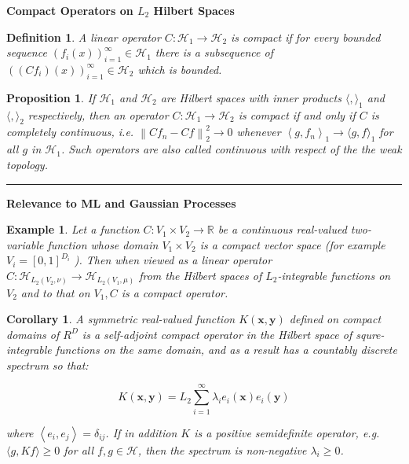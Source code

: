 \documentclass[11pt]{article}
\theoremstyle{plain} %
\newtheorem{corollary}[theorem]{Corollary}
\newtheorem{proposition}[theorem]{Proposition}
\newtheorem{definition}[theorem]{Definition}
\newtheorem{example}[theorem]{Example}
\theoremstyle{remark}
\begin{document}
\textbf{Compact Operators on $L_{2}$ Hilbert Spaces}
\begin{definition}
  A linear operator $C: \mathcal{H}_{1} \rightarrow \mathcal{H}_{2}$ is compact if
for every bounded sequence $\left(f_{i}(x)\right)_{i=1}^{\infty} \in
  \mathcal{H}_{1}$ there is a subsequence of $\left(\left(C
  f_{i}\right)(x)\right)_{i=1}^{\infty} \in \mathcal{H}_{2}$ which is bounded.
\end{definition}

\begin{proposition}
  If $\mathcal{H}_{1}$ and $\mathcal{H}_{2}$ are Hilbert spaces with inner
products $\langle,\rangle_{1}$ and $\langle,\rangle_{2}$ respectively, then an
operator $C: \mathcal{H}_{1} \rightarrow \mathcal{H}_{2}$ is compact if and only
if $C$ is completely continuous, i.e. $\left\|C f_{n}-C f\right\|_{2}^{2}
  \rightarrow 0$ whenever $\left\langle g, f_{n}\right\rangle_{1}
  \rightarrow\langle g, f\rangle_{1}$ for all $g$ in $\mathcal{H}_{1}$. Such
operators are also called continuous with respect of the the weak topology.
\end{proposition}
\vspace*{0.4em}
\hrule

\textbf{Relevance to ML and Gaussian Processes}

\begin{example}
Let a function $C: V_{1} \times V_{2} \rightarrow \mathbb{R}$ be a continuous
real-valued two-variable function whose domain $V_{1} \times V_{2}$ is a compact
vector space (for example $V_{i}=[0,1]^{D_{i}}$ ). Then when viewed as a linear
operator $C: \mathcal{H}_{L_{2}\left(V_{2}, \nu\right)} \rightarrow
  \mathcal{H}_{L_{2}\left(V_{1}, \mu\right)}$ from the Hilbert spaces of
$L_{2}$-integrable functions on $V_{2}$ and to that on $V_{1}, C$ is a compact
operator.
\end{example}

\begin{corollary}
  A symmetric real-valued function $K(\mathbf{x}, \mathbf{y})$ defined on compact
domains of $R^{D}$ is a self-adjoint compact operator in the Hilbert space of
squre-integrable functions on the same domain, and as a result has a countably
discrete spectrum so that:

$$
  K(\mathbf{x}, \mathbf{y})=L_{2} \sum_{i=1}^{\infty} \lambda_{i} e_{i}(\mathbf{x}) e_{i}(\mathbf{y})
$$

where $\left\langle e_{i}, e_{j}\right\rangle=\delta_{i j}$. If in addition $K$
is a positive semidefinite operator, e.g. $\langle g, K f\rangle \geq 0$ for all
$f, g \in \mathcal{H}$, then the spectrum is non-negative $\lambda_{i} \geq 0$.
\end{corollary}
\end{document}
